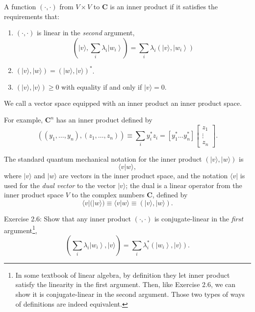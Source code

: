 \documentclass[
	11pt, %
	fleqn, %
	a4paper, %
]{LegrandOrangeBook}
\begin{document}


A function $(\cdot, \cdot)$ from $V \times V$ to $\mathbf{C}$ is an inner product if it satisfies the requirements that:
\begin{enumerate}
    \item $(\cdot, \cdot)$ is linear in the \textit{second} argument, 
$$
\left(|v\rangle, \sum_{i} \lambda_{i}\left|w_{i}\right\rangle\right)=\sum_{i} \lambda_{i}\left(|v\rangle,\left|w_{i}\right\rangle\right)
$$
    \item $(|v\rangle,|w\rangle)=(|w\rangle,|v\rangle)^{*}$.
    \item $(|v\rangle,|v\rangle) \geq 0$ with equality if and only if $|v\rangle=0$.
\end{enumerate}
We call a vector space equipped with an inner product an inner product space.

\begin{example}
    For example, $\mathbf{C}^{n}$ has an inner product defined by
$$
\left(\left(y_{1}, \ldots, y_{n}\right),\left(z_{1}, \ldots, z_{n}\right)\right) \equiv \sum_{i} y_{i}^{*} z_{i}=\left[y_{1}^{*} \ldots y_{n}^{*}\right]\left[\begin{array}{c}
z_{1} \\
\vdots \\
z_{n}
\end{array}\right].
$$
\end{example}

The standard quantum mechanical notation for the inner product $(|v\rangle,|w\rangle)$ is $$\langle v | w\rangle,$$where $|v\rangle$ and $|w\rangle$ are vectors in the inner product space, and the notation $\langle v|$ is used for the \textit{dual vector} to the vector $|v\rangle$; the dual is a linear operator from the inner product space $V$ to the complex numbers $\mathbf{C}$, defined by
$$
\langle v|(|w\rangle) \equiv\langle v | w\rangle \equiv(|v\rangle,|w\rangle).
$$


\begin{exercise}
    Exercise 2.6: Show that any inner product $(\cdot, \cdot)$ is conjugate-linear in the \textit{first} argument\footnote{In some textbook of linear algebra, by definition they let inner product satisfy the linearity in the first argument. Then, like Exercise 2.6, we can show it is conjugate-linear in the second argument. Those two types of ways of definitions are indeed equivalent. },
$$
\left(\sum_{i} \lambda_{i}\left|w_{i}\right\rangle,|v\rangle\right)=\sum_{i} \lambda_{i}^{*}\left(\left|w_{i}\right\rangle,|v\rangle\right) .
$$
\end{exercise}
\end{document}
